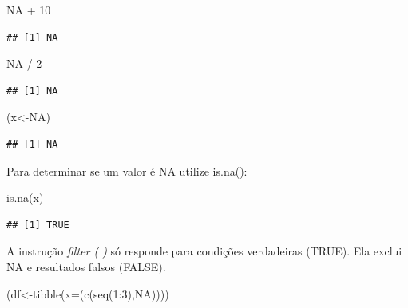 \documentclass[
]{article}
\newenvironment{Shaded}{\begin{snugshade}}{\end{snugshade}}
\newcommand{\AttributeTok}[1]{\textcolor[rgb]{0.77,0.63,0.00}{#1}}
\newcommand{\ConstantTok}[1]{\textcolor[rgb]{0.00,0.00,0.00}{#1}}
\newcommand{\DecValTok}[1]{\textcolor[rgb]{0.00,0.00,0.81}{#1}}
\newcommand{\FunctionTok}[1]{\textcolor[rgb]{0.00,0.00,0.00}{#1}}
\newcommand{\NormalTok}[1]{#1}
\newcommand{\OtherTok}[1]{\textcolor[rgb]{0.56,0.35,0.01}{#1}}
\newcommand{\SpecialCharTok}[1]{\textcolor[rgb]{0.00,0.00,0.00}{#1}}
\begin{document}
\begin{Shaded}
\begin{Highlighting}[]
\ConstantTok{NA} \SpecialCharTok{+} \DecValTok{10}
\end{Highlighting}
\end{Shaded}

\begin{verbatim}
## [1] NA
\end{verbatim}

\begin{Shaded}
\begin{Highlighting}[]
\ConstantTok{NA} \SpecialCharTok{/} \DecValTok{2}
\end{Highlighting}
\end{Shaded}

\begin{verbatim}
## [1] NA
\end{verbatim}

\begin{Shaded}
\begin{Highlighting}[]
\NormalTok{(x}\OtherTok{\textless{}{-}}\ConstantTok{NA}\NormalTok{)}
\end{Highlighting}
\end{Shaded}

\begin{verbatim}
## [1] NA
\end{verbatim}

Para determinar se um valor é NA utilize is.na():

\begin{Shaded}
\begin{Highlighting}[]
\FunctionTok{is.na}\NormalTok{(x)}
\end{Highlighting}
\end{Shaded}

\begin{verbatim}
## [1] TRUE
\end{verbatim}

A instrução \emph{filter ( )} só responde para condições verdadeiras
(TRUE). Ela exclui NA e resultados falsos (FALSE).

\begin{Shaded}
\begin{Highlighting}[]
\NormalTok{(df}\OtherTok{\textless{}{-}}\FunctionTok{tibble}\NormalTok{(}\AttributeTok{x=}\NormalTok{(}\FunctionTok{c}\NormalTok{(}\FunctionTok{seq}\NormalTok{(}\DecValTok{1}\SpecialCharTok{:}\DecValTok{3}\NormalTok{),}\ConstantTok{NA}\NormalTok{))))}
\end{Highlighting}
\end{Shaded}
\end{document}
